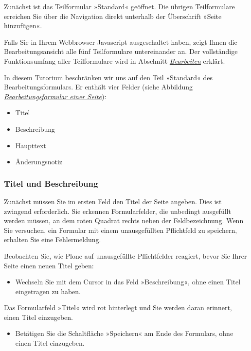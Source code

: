 \documentclass[a4paper,12pt,ngerman]{manual}
\begin{document}
Zunächst ist das Teilformular »Standard« geöffnet. Die übrigen Teilformulare
erreichen Sie über die Navigation direkt unterhalb der Überschrift »Seite
hinzufügen«.

Falls Sie in Ihrem Webbrowser Javascript ausgeschaltet haben, zeigt Ihnen die
Bearbeitungsansicht alle fünf Teilformulare untereinander an. Der vollständige
Funktionsumfang aller Teilformulare wird in Abschnitt \hyperlink{sec-bearbeiten}{\emph{Bearbeiten}}
erklärt.

In diesem Tutorium beschränken wir uns auf den Teil »Standard« des
Bearbeitungsformulars. Er enthält vier Felder (siehe
Abbildung \hyperlink{fig-homepage-edit-1}{\emph{Bearbeitungsformular einer Seite}}):
\begin{itemize}
\item {} 
Titel

\item {} 
Beschreibung

\item {} 
Haupttext

\item {} 
Änderungsnotiz

\end{itemize}


\subsubsection{Titel und Beschreibung}

Zunächst müssen Sie im ersten Feld den Titel der Seite angeben. Dies ist
zwingend erforderlich. Sie erkennen Formularfelder, die unbedingt ausgefüllt
werden müssen, an dem roten Quadrat rechts neben der Feldbezeichnung. Wenn Sie
versuchen, ein Formular mit einem unausgefüllten Pflichtfeld zu speichern,
erhalten Sie eine Fehlermeldung.

Beobachten Sie, wie Plone auf unausgefüllte Pflichtfelder reagiert, bevor Sie
Ihrer Seite einen neuen Titel geben:
\begin{itemize}
\item {} 
Wechseln Sie mit dem Cursor in das Feld »Beschreibung«, ohne einen
Titel eingetragen zu haben.

\end{itemize}

Das Formularfeld »Titel« wird rot hinterlegt und Sie werden daran
erinnert, einen Titel einzugeben.
\begin{itemize}
\item {} 
Betätigen Sie die Schaltfläche »Speichern« am Ende des Formulars, ohne
einen Titel einzugeben.

\end{itemize}
\end{document}

